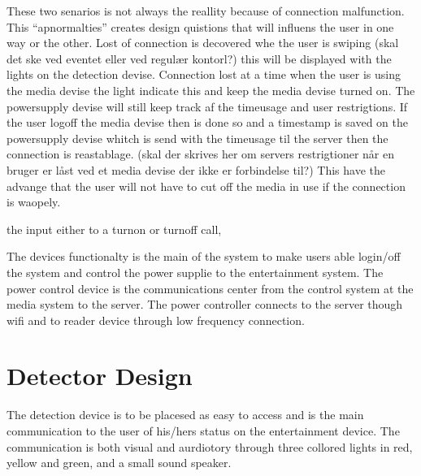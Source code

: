 These two senarios is not always the reallity because of connection malfunction. 
This "`apnormalties"' creates design quistions that will influens the user in one way or the other.   
Lost of connection is decovered whe the user is swiping (skal det ske ved eventet eller ved regulær kontorl?) this will be displayed with the lights on the detection devise. Connection lost at a time when the user is using the media devise the light indicate this and keep the media devise turned on. The powersupply devise will still keep track af the timeusage and user restrigtions. If the user logoff the media devise then is done so and a timestamp is saved on the powersupply devise whitch is send with the timeusage til the server then the connection is reastablage. (skal der skrives her om servers restrigtioner når en bruger er låst ved et media devise der ikke er forbindelse til?) This have the advange that the user will not have to cut off the media in use if the connection is waopely. 




  the input either to a turnon or turnoff call,    

The devices functionalty is the main of the system to make users able login/off the system and control the power supplie to the entertainment system. The power control device is the communications center from the control system at the media system to the server. The power controller connects to the server though wifi and to reader device through low frequency connection. 


\section{Detector Design}

The detection device is to be placesed as easy to access and is the main communication to the user of his/hers status on the entertainment device.
The communication is both visual and aurdiotory through three collored lights in red, yellow and green, and a small sound speaker.
